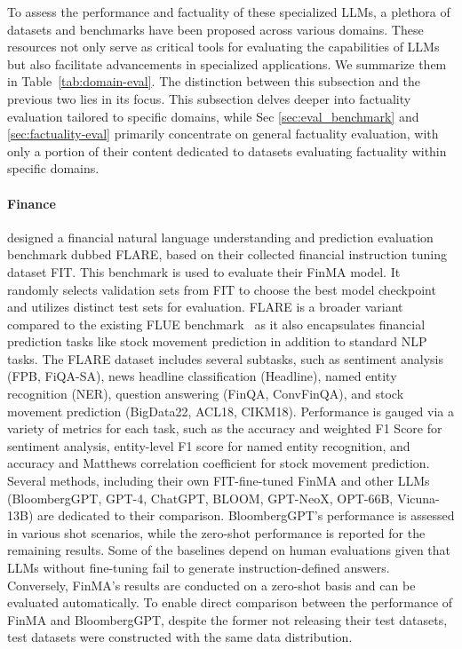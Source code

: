 
\label{sec:domain-eval}


To assess the performance and factuality of these specialized LLMs, a plethora of datasets and benchmarks have been proposed across various domains. These resources not only serve as critical tools for evaluating the capabilities of LLMs but also facilitate advancements in specialized applications. We summarize them in Table~\ref{tab:domain-eval}. The distinction between this subsection and the previous two lies in its focus. This subsection delves deeper into factuality evaluation tailored to specific domains, while Sec \ref{sec:eval_benchmark} and \ref{sec:factuality-eval} primarily concentrate on general factuality evaluation, with only a portion of their content dedicated to datasets evaluating factuality within specific domains.


{\paragraph{Finance}}
\citet{xie2023pixiu} designed a financial natural language understanding and prediction evaluation benchmark dubbed FLARE, based on their collected financial instruction tuning dataset FIT. This benchmark is used to evaluate their FinMA model. It randomly selects validation sets from FIT to choose the best model checkpoint and utilizes distinct test sets for evaluation.
FLARE is a broader variant compared to the existing FLUE benchmark~\cite{shah2022flue} as it also encapsulates financial prediction tasks like stock movement prediction in addition to standard NLP tasks. 
The FLARE dataset includes several subtasks, such as sentiment analysis (FPB, FiQA-SA), news headline  classification (Headline), named entity recognition (NER), question answering (FinQA, ConvFinQA), and stock movement prediction (BigData22, ACL18, CIKM18).
Performance is gauged via a variety of metrics for each task, such as the accuracy and weighted F1 Score for sentiment analysis, entity-level F1 score for named entity recognition, and accuracy and Matthews correlation coefficient for stock movement prediction.
Several methods, including their own FIT-fine-tuned FinMA and other LLMs (BloombergGPT, GPT-4, ChatGPT, BLOOM, GPT-NeoX, OPT-66B, Vicuna-13B) are dedicated to their comparison. BloombergGPT's performance is assessed in various shot scenarios, while the zero-shot performance is reported for the remaining results. Some of the baselines depend on human evaluations given that LLMs without fine-tuning fail to generate instruction-defined answers. Conversely, FinMA's results are conducted on a zero-shot basis and can be evaluated automatically. 
To enable direct comparison between the performance of FinMA and BloombergGPT, despite the former not releasing their test datasets, test datasets were constructed with the same data distribution.

